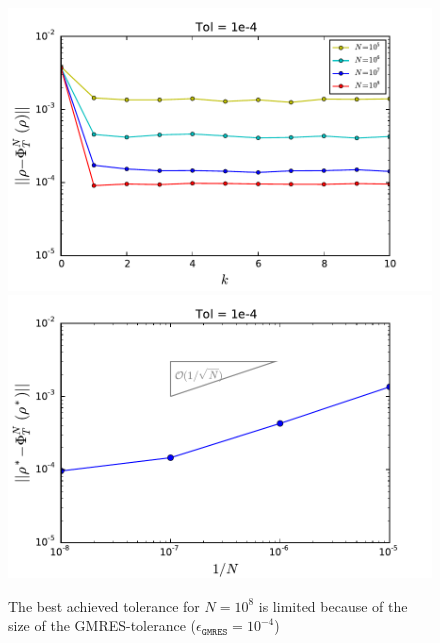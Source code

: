 \begin{figure}[H!]
\centering
\includegraphics[width=0.5\linewidth]{../Problems/WeightedParticles/checkSystem/Newton/plots/Newton_sde_res(k)_Dt_e-2_tol1e-4}
\includegraphics[width=0.49\linewidth]{../Problems/WeightedParticles/checkSystem/Newton/plots/Tolerance_on_NK-solution_converges_N-1_tol_1e-4}

\caption{ The best achieved tolerance for $N=10^8$ is limited because of the size of the GMRES-tolerance ($\epsilon_{\texttt{GMRES}}=10^{-4}$)
}
\label{fig:Newton_sde_res(k)_tol1e-4}
\end{figure}




%
%
%


